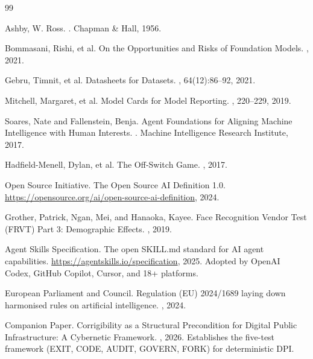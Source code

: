 \documentclass[11pt,a4paper]{article}
\theoremstyle{definition}
\begin{document}

\begin{thebibliography}{99}

Ashby, W. Ross.
.
\newblock Chapman \& Hall, 1956.

Bommasani, Rishi, et al.
\newblock On the Opportunities and Risks of Foundation Models.
, 2021.

Gebru, Timnit, et al.
\newblock Datasheets for Datasets.
, 64(12):86--92, 2021.

Mitchell, Margaret, et al.
\newblock Model Cards for Model Reporting.
, 220--229, 2019.

Soares, Nate and Fallenstein, Benja.
\newblock Agent Foundations for Aligning Machine Intelligence with Human Interests.
. Machine Intelligence Research Institute, 2017.

Hadfield-Menell, Dylan, et al.
\newblock The Off-Switch Game.
, 2017.

Open Source Initiative.
\newblock The Open Source AI Definition 1.0.
\newblock \url{https://opensource.org/ai/open-source-ai-definition}, 2024.

Grother, Patrick, Ngan, Mei, and Hanaoka, Kayee.
\newblock Face Recognition Vendor Test (FRVT) Part 3: Demographic Effects.
, 2019.

Agent Skills Specification.
\newblock The open SKILL.md standard for AI agent capabilities.
\newblock \url{https://agentskills.io/specification}, 2025.
\newblock Adopted by OpenAI Codex, GitHub Copilot, Cursor, and 18+ platforms.

European Parliament and Council.
\newblock Regulation (EU) 2024/1689 laying down harmonised rules on artificial intelligence.
, 2024.

Companion Paper.
\newblock Corrigibility as a Structural Precondition for Digital Public Infrastructure: A Cybernetic Framework.
, 2026.
\newblock Establishes the five-test framework (EXIT, CODE, AUDIT, GOVERN, FORK) for deterministic DPI.

\end{thebibliography}
\end{document}
